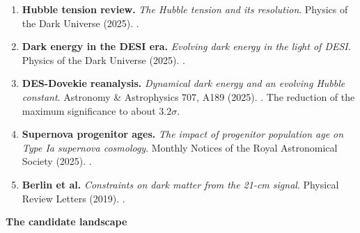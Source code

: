 \begin{enumerate}[leftmargin=1.4em,itemsep=4pt,start=30]
\item \textbf{Hubble tension review.} \emph{The Hubble tension and its
resolution}. Physics of the Dark Universe (2025).
.
\item \textbf{Dark energy in the DESI era.} \emph{Evolving dark energy in
the light of DESI}. Physics of the Dark Universe (2025).
.
\item \textbf{DES-Dovekie reanalysis.} \emph{Dynamical dark energy and an
evolving Hubble constant}. Astronomy \& Astrophysics 707, A189 (2025).
. The reduction of the maximum
significance to about $3.2\sigma$.
\item \textbf{Supernova progenitor ages.} \emph{The impact of progenitor
population age on Type Ia supernova cosmology}. Monthly Notices of the
Royal Astronomical Society (2025).
.
\item \textbf{Berlin et al.} \emph{Constraints on dark matter from the
21-cm signal}. Physical Review Letters (2019).
.
\end{enumerate}

\vspace{8pt}
{\sffamily\bfseries\small The candidate landscape}

